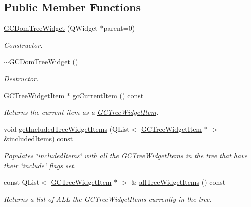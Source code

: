 \subsection*{\-Public \-Member \-Functions}
\begin{DoxyCompactItemize}
\item 
\hyperlink{class_g_c_dom_tree_widget_a915a336d44b042d8a134abef8805bed4}{\-G\-C\-Dom\-Tree\-Widget} (\-Q\-Widget $\ast$parent=0)
\begin{DoxyCompactList}\small\item\em \-Constructor. \end{DoxyCompactList}\item 
\hyperlink{class_g_c_dom_tree_widget_aca9ba75d3798606da3f4e86c2a4b7113}{$\sim$\-G\-C\-Dom\-Tree\-Widget} ()
\begin{DoxyCompactList}\small\item\em \-Destructor. \end{DoxyCompactList}\item 
\hyperlink{class_g_c_tree_widget_item}{\-G\-C\-Tree\-Widget\-Item} $\ast$ \hyperlink{class_g_c_dom_tree_widget_a70d6a155777d375f3923c2d66e702d15}{gc\-Current\-Item} () const 
\begin{DoxyCompactList}\small\item\em \-Returns the current item as a \hyperlink{class_g_c_tree_widget_item}{\-G\-C\-Tree\-Widget\-Item}. \end{DoxyCompactList}\item 
void \hyperlink{class_g_c_dom_tree_widget_ad26a2880721b62182091ead365799d57}{get\-Included\-Tree\-Widget\-Items} (\-Q\-List$<$ \hyperlink{class_g_c_tree_widget_item}{\-G\-C\-Tree\-Widget\-Item} $\ast$ $>$ \&included\-Items) const 
\begin{DoxyCompactList}\small\item\em \-Populates \char`\"{}included\-Items\char`\"{} with all the \-G\-C\-Tree\-Widget\-Items in the tree that have their \char`\"{}include\char`\"{} flags set. \end{DoxyCompactList}\item 
const \-Q\-List$<$ \hyperlink{class_g_c_tree_widget_item}{\-G\-C\-Tree\-Widget\-Item} $\ast$ $>$ \& \hyperlink{class_g_c_dom_tree_widget_a913ceee0af8eefd3ec41115b64008b55}{all\-Tree\-Widget\-Items} () const 
\begin{DoxyCompactList}\small\item\em \-Returns a list of \-A\-L\-L the \-G\-C\-Tree\-Widget\-Items currently in the tree. \end{DoxyCompactList}\item 

\end{DoxyCompactItemize}
